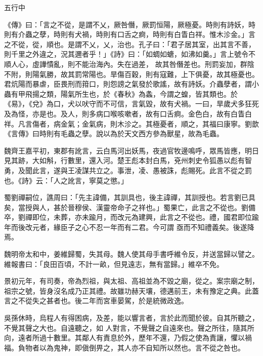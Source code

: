 
\begin{pinyinscope}

 五行中



 《傳》曰：「言之不從，是謂不乂，厥咎僭，厥罰恒陽，厥極憂。時則有詩妖，時則有介蟲之孽，時則有犬禍，時則有口舌之痾，時則有白眚白祥。惟木沴金。」言之不從，從，順也。是謂不乂，乂，治也。孔子曰：「君子居其室，出其言不善，則千里之外違之，況其邇者乎！」《詩》曰：「如蜩如螗，如沸如羹。」言上號令不順人心，虛譁憒亂，則不能治海內。失在過差，
 故其咎僭差也。刑罰妄加，群陰不附，則陽氣勝，故其罰常陽也。旱傷百穀，則有寇難，上下俱憂，故其極憂也。君炕陽而暴虐，臣畏刑而箝口，則怨謗之氣發於歌謠，故有詩妖。介蟲孽者，謂小蟲有甲飛揚之類，陽氣所生也，於《春秋》為螽，今謂之蝗，皆其類也。於《易》，《兌》為口，犬以吠守而不可信，言氣毀，故有犬禍。一曰，旱歲犬多狂死及為怪，亦是也。及人，則多病口喉咳嗽者，故有口舌痾。金色白，故有白眚白祥。凡言傷者，病金氣；金氣病，則木沴之。其極憂者，順之，其福曰康寧。劉歆《言傳》曰時則有毛蟲之孽。說以為於天文西方參為獸星，故為毛蟲。



 魏齊王嘉平初，東郡有訛言，云白馬河出妖馬，夜過官牧邊鳴呼，眾馬皆應，明日見其跡，大如斛，行數里，還入河。楚王彪本封白馬，兗州刺史令狐愚以彪有智勇，及聞此言，遂與王凌謀共立之。事泄，凌、愚被誅，彪賜死。此言不從之罰也。《詩》云：「人之訛言，寧莫之懲。」



 蜀劉禪嗣位，譙周曰：「先主諱備，其訓具也，後主諱禪，其訓授也。若言劉已具矣，當授與人，甚於晉穆侯、漢靈帝命子之祥也。」蜀果亡，此言之不從也。劉備卒，劉禪即位，未葬，亦未踰月，而改元為建興，此言之不從也。禮，國君即位踰年而後改元者，緣臣子之心不忍一年而有二君。今可謂
 亟而不知禮義矣。後遂降焉。



 魏明帝太和中，姜維歸蜀，失其母。魏人使其母手書呼維令反，并送當歸以譬之。維報書曰：「良田百頃，不計一畝，但見遠志，無有當歸。」維卒不免。



 景初元年，有司奏，帝為烈祖，與太祖、高祖並為不毀之廟，從之。案宗廟之制，祖宗之號，皆身沒名成乃正其禮。故雖功赫天壤，德邁前王，未有豫定之典。此蓋言之不從失之甚者也。後二年而宮車晏駕，於是統微政逸。



 吳孫休時，烏程人有得困病，及差，能以響言者，言於此而聞於彼。自其所聽之，不覺其聲之大也。自遠聽之，如
 人對言，不覺聲之自遠來也。聲之所往，隨其所向，遠者所過十數里。其鄰人有責息於外，歷年不還，乃假之使為責讓，懼以禍福。負物者以為鬼神，即傎倒畀之，其人亦不自知所以然也。言不從之咎也。




\end{pinyinscope}
